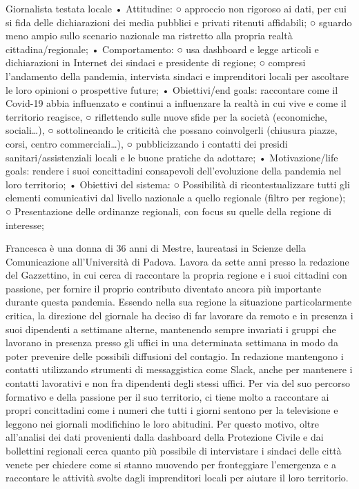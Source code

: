 Giornalista testata locale
	• Attitudine:
		○ approccio non rigoroso ai dati, per cui si fida delle dichiarazioni dei media pubblici e privati ritenuti affidabili;
		○ sguardo meno ampio sullo scenario nazionale ma ristretto alla propria realtà cittadina/regionale;
	• Comportamento: 
		○ usa dashboard e legge articoli e dichiarazioni in Internet dei sindaci e presidente di regione;
		○ compresi l'andamento della pandemia, intervista sindaci e imprenditori locali per ascoltare le loro opinioni o prospettive future;
	• Obiettivi/end goals: raccontare come il Covid-19 abbia influenzato e continui a influenzare la realtà in cui vive e come il territorio reagisce,
		○ riflettendo sulle nuove sfide per la società (economiche, sociali…),
		○ sottolineando le criticità che possano coinvolgerli (chiusura piazze, corsi, centro commerciali…),
		○ pubblicizzando i contatti dei presidi sanitari/assistenziali locali e le buone pratiche da adottare;
	• Motivazione/life goals: rendere i suoi concittadini consapevoli dell'evoluzione della pandemia nel loro territorio;
	• Obiettivi del sistema:
		○ Possibilità di ricontestualizzare tutti gli elementi comunicativi dal livello nazionale a quello regionale (filtro per regione);
		○ Presentazione delle ordinanze regionali, con focus su quelle della regione di interesse;

        
Francesca è una donna di 36 anni di Mestre, laureatasi in Scienze della Comunicazione all'Università di Padova.
Lavora da sette anni presso la redazione del Gazzettino, in cui cerca di raccontare la propria regione e i suoi cittadini con passione, per fornire il proprio contributo diventato ancora più importante durante questa pandemia.
Essendo nella sua regione la situazione particolarmente critica, la direzione del giornale ha deciso di far lavorare da remoto e in presenza i suoi dipendenti a settimane alterne, mantenendo sempre invariati i gruppi che lavorano in presenza presso gli uffici in una determinata settimana in modo da poter prevenire delle possibili diffusioni del contagio. In redazione mantengono i contatti utilizzando strumenti di messaggistica come Slack, anche per mantenere i contatti lavorativi e non fra dipendenti degli stessi uffici.
Per via del suo percorso formativo e della passione per il suo territorio, ci tiene molto a raccontare ai propri concittadini come i numeri che tutti i giorni sentono per la televisione e leggono nei giornali modifichino le loro abitudini. Per questo motivo, oltre all'analisi dei dati provenienti dalla dashboard della Protezione Civile e dai bollettini regionali cerca quanto più possibile di intervistare i sindaci delle città venete per chiedere come si stanno muovendo per fronteggiare l'emergenza e a raccontare le attività svolte dagli imprenditori locali per aiutare il loro territorio.



